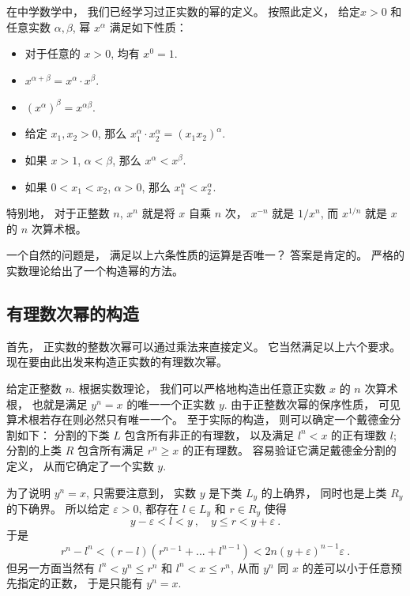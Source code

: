 

在中学数学中， 我们已经学习过正实数的幂的定义。 按照此定义， 给定$x>0$ 和任意实数 $\alpha,\beta$, 幂 $x^\alpha$ 满足如下性质：

\begin{itemize}
\item 对于任意的 $x>0$, 均有 $x^0=1$.
\item $x^{\alpha+\beta}=x^\alpha\cdot x^\beta$.
\item $(x^\alpha)^\beta=x^{\alpha\beta}$.
\item 给定 $x_1,x_2>0$, 那么 $x_1^\alpha\cdot x_2^\alpha=(x_1x_2)^\alpha$.
\item 如果 $x>1$, $\alpha<\beta$, 那么 $x^\alpha<x^\beta$.
\item 如果 $0<x_1<x_2$, $\alpha>0$, 那么 $x_1^\alpha<x_2^\alpha$.
\end{itemize}

特别地， 对于正整数 $n$, $x^n$ 就是将 $x$ 自乘 $n$ 次， $x^{-n}$ 就是 $1/x^n$, 而 $x^{1/n}$ 就是 $x$ 的 $n$ 次算术根。 

一个自然的问题是， 满足以上六条性质的运算是否唯一？ 答案是肯定的。 严格的实数理论给出了一个构造幂的方法。

\subsection{有理数次幂的构造}

首先， 正实数的整数次幂可以通过乘法来直接定义。 它当然满足以上六个要求。 现在要由此出发来构造正实数的有理数次幂。

给定正整数 $n$. 根据实数理论， 我们可以严格地构造出任意正实数 $x$ 的 $n$ 次算术根， 也就是满足 $y^n=x$ 的唯一一个正实数 $y$. 由于正整数次幂的保序性质， 可见算术根若存在则必然只有唯一一个。 至于实际的构造， 则可以确定一个戴德金分割如下： 分割的下类 $L$ 包含所有非正的有理数， 以及满足 $l^n<x$ 的正有理数 $l$; 分割的上类 $R$ 包含所有满足 $r^n\geq x$ 的正有理数。 容易验证它满足戴德金分割的定义， 从而它确定了一个实数 $y$. 

为了说明 $y^n=x$, 只需要注意到， 实数 $y$ 是下类 $L_y$ 的上确界， 同时也是上类 $R_y$ 的下确界。 所以给定 $\varepsilon>0$, 都存在 $l\in L_y$ 和 $r\in R_y$ 使得
\[
y-\varepsilon<l<y~,\quad y\leq r<y+\varepsilon~.
\]
于是
\[ 
r^n-l^n<(r-l)(r^{n-1}+...+l^{n-1})
<2n(y+\varepsilon)^{n-1}\varepsilon~.
\]
但另一方面当然有 $l^n<y^n\leq r^n$ 和 $l^n<x\leq r^n$, 从而 $y^n$ 同 $x$ 的差可以小于任意预先指定的正数， 于是只能有 $y^n=x$.

